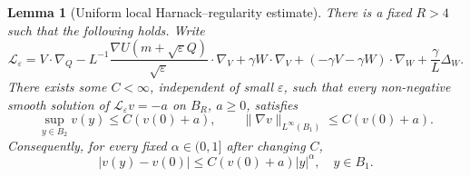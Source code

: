 \documentclass[11pt]{article}
\numberwithin{equation}{section}
\theoremstyle{plain}
\newtheorem{lemma}[theorem]{Lemma}
\theoremstyle{definition}
\theoremstyle{remark}
\newcommand{\eps}{\varepsilon}
\begin{document}
\begin{lemma}[Uniform local Harnack--regularity estimate]
\label{lem:uniform-local-harnack-holder}
There is a fixed $R>4$ such that the following holds.  Write
\[
\mathscr L_\eps
=V\cdot\nabla_Q
-L^{-1}\frac{\nabla U(m+\sqrt\eps Q)}{\sqrt\eps}\cdot\nabla_V
+\gamma W\cdot\nabla_V
+(-\gamma V-\gamma W)\cdot\nabla_W
+\frac{\gamma}{L}\Delta_W .
\]
There exists some $C<\infty$, independent of small $\eps$, such that every
non-negative smooth solution of
$\mathscr L_\eps v=-a$ on $B_R$, $a\ge0$, satisfies
\begin{equation}
\label{eq:uniform-local-harnack-gradient}
\sup_{y\in B_2}v(y)\le C\left(v(0)+a\right),
\qquad
\|\nabla v\|_{L^\infty(B_1)}\le C\left(v(0)+a\right).
\end{equation}
Consequently, for every fixed $\alpha\in(0,1]$ after changing $C$,
\[
|v(y)-v(0)|\le C\left(v(0)+a\right)|y|^\alpha,
\quad y\in B_1.
\]
\end{lemma}
\end{document}
